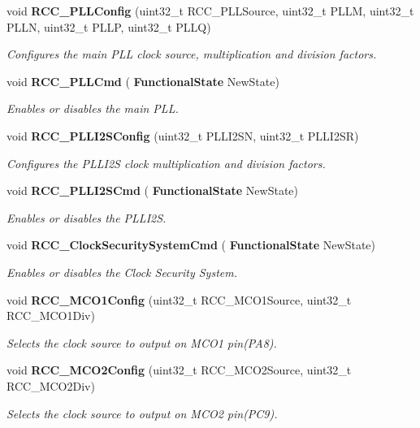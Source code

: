 \begin{DoxyCompactItemize}
void \textbf{ R\+C\+C\+\_\+\+P\+L\+L\+Config} (uint32\+\_\+t R\+C\+C\+\_\+\+P\+L\+L\+Source, uint32\+\_\+t P\+L\+LM, uint32\+\_\+t P\+L\+LN, uint32\+\_\+t P\+L\+LP, uint32\+\_\+t P\+L\+LQ)
\begin{DoxyCompactList}\small\item\em Configures the main P\+LL clock source, multiplication and division factors. \end{DoxyCompactList}\item 
void \textbf{ R\+C\+C\+\_\+\+P\+L\+L\+Cmd} (\textbf{ Functional\+State} New\+State)
\begin{DoxyCompactList}\small\item\em Enables or disables the main P\+LL. \end{DoxyCompactList}\item 
void \textbf{ R\+C\+C\+\_\+\+P\+L\+L\+I2\+S\+Config} (uint32\+\_\+t P\+L\+L\+I2\+SN, uint32\+\_\+t P\+L\+L\+I2\+SR)
\begin{DoxyCompactList}\small\item\em Configures the P\+L\+L\+I2S clock multiplication and division factors. \end{DoxyCompactList}\item 
void \textbf{ R\+C\+C\+\_\+\+P\+L\+L\+I2\+S\+Cmd} (\textbf{ Functional\+State} New\+State)
\begin{DoxyCompactList}\small\item\em Enables or disables the P\+L\+L\+I2S. \end{DoxyCompactList}\item 
void \textbf{ R\+C\+C\+\_\+\+Clock\+Security\+System\+Cmd} (\textbf{ Functional\+State} New\+State)
\begin{DoxyCompactList}\small\item\em Enables or disables the Clock Security System. \end{DoxyCompactList}\item 
void \textbf{ R\+C\+C\+\_\+\+M\+C\+O1\+Config} (uint32\+\_\+t R\+C\+C\+\_\+\+M\+C\+O1\+Source, uint32\+\_\+t R\+C\+C\+\_\+\+M\+C\+O1\+Div)
\begin{DoxyCompactList}\small\item\em Selects the clock source to output on M\+C\+O1 pin(\+P\+A8). \end{DoxyCompactList}\item 
void \textbf{ R\+C\+C\+\_\+\+M\+C\+O2\+Config} (uint32\+\_\+t R\+C\+C\+\_\+\+M\+C\+O2\+Source, uint32\+\_\+t R\+C\+C\+\_\+\+M\+C\+O2\+Div)
\begin{DoxyCompactList}\small\item\em Selects the clock source to output on M\+C\+O2 pin(\+P\+C9). \end{DoxyCompactList}\item 

\end{DoxyCompactItemize}
